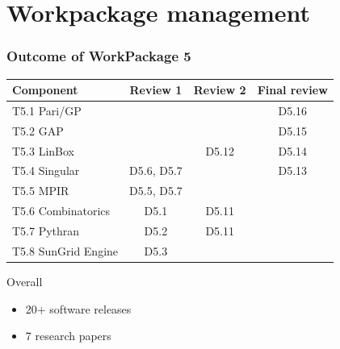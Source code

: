 \documentclass{beamer}
\begin{document}
\section{Workpackage management}
\begin{frame}
  \frametitle{Outcome of WorkPackage 5}

  \begin{tabular}{lccc}
    \toprule
    Component & Review 1 & Review 2 & Final review\\
    \midrule
    T5.1 Pari/GP & & & {\color{green} D5.16} \\
    T5.2 GAP     & & & {\color{green} D5.15} \\
    T5.3 LinBox  & & \alert{D5.12} & {\color{green} D5.14} \\
    T5.4 Singular& D5.6, D5.7 & & {\color{green} D5.13} \\
    T5.5 MPIR    & D5.5, D5.7& & \\
    T5.6 Combinatorics  & D5.1& \alert{D5.11} & \\
    T5.7 Pythran        & D5.2 & \alert{D5.11} & \\
    T5.8 SunGrid Engine & D5.3 & & \\
    \bottomrule
    
  \end{tabular}

  \vspace{1em}
  
  Overall
  \begin{itemize}
  \item 20+ software releases
  \item 7 research papers
  \end{itemize}
\end{frame}
\end{document}
